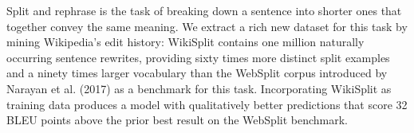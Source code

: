 Split and rephrase is the task of breaking down a sentence into shorter ones that together convey the same meaning. We extract a rich new dataset for this task by mining Wikipedia's edit history: WikiSplit contains one million naturally occurring sentence rewrites, providing sixty times more distinct split examples and a ninety times larger vocabulary than the WebSplit corpus introduced by Narayan et al. (2017) as a benchmark for this task. Incorporating WikiSplit as training data produces a model with qualitatively better predictions that score 32 BLEU points above the prior best result on the WebSplit benchmark.
